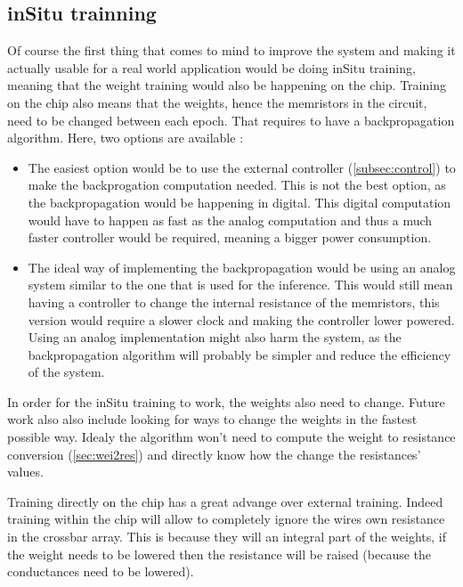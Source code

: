 \subsection{inSitu trainning}\label{subsec:inSitu}

Of course the first thing that comes to mind to improve the system and making it actually usable for a real world application would be doing inSitu training, meaning that the weight training would also be happening on the chip. Training on the chip also means that the weights, hence the memristors in the circuit, need to be changed between each epoch. That requires to have a backpropagation algorithm. Here, two options are available :

\begin{itemize}
  \item The easiest option would be to use the external controller (\cref{subsec:control}) to make the backprogation computation needed. This is not the best option, as the backpropagation would be happening in digital. This digital computation would have to happen as fast as the analog computation and thus a much faster controller would be required, meaning a bigger power consumption.
  \item The ideal way of implementing the backpropagation would be using an analog system similar to the one that is used for the inference. This would still mean having a controller to change the internal resistance of the memristors, this version would require a slower clock and making the controller lower powered. Using an analog implementation might also harm the system, as the backpropagation algorithm will probably be simpler and reduce the efficiency of the system.
\end{itemize}

In order for the inSitu training to work, the weights also need to change. Future work also also include looking for ways to change the weights in the fastest possible way. Idealy the algorithm won't need to compute the weight to resistance conversion (\cref{sec:wei2res}) and directly know how the change the resistances' values.

Training directly on the chip has a great advange over external training. Indeed training within the chip will allow to completely ignore the wires own resistance in the crossbar array. This is because they will an integral part of the weights, if the weight needs to be lowered then the resistance will be raised (because the conductances need to be lowered). %

